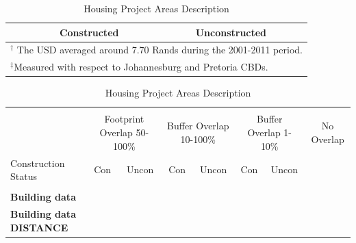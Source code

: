 \documentclass[12pt]{article}
\begin{document}
\vspace{0mm}
\begin{table}[h!]
\centering
\caption{Housing Project Areas Description}\label{table:projectdescriptives}
\vspace{0mm}
\begin{tabular}{l*{1}{cc}}
\toprule
  &Constructed & Unconstructed \\
\midrule

\bottomrule
\multicolumn{3}{l}{\scriptsize $^\dagger$ The USD averaged around 7.70 Rands during the 2001-2011 period.}\\[-.5em]
\multicolumn{3}{l}{\scriptsize $^\ddagger$Measured with respect to Johannesburg and Pretoria CBDs. } \\[-.5em]
\end{tabular}
\end{table} 



\vspace{0mm}
\begin{table}[h!]
\centering
\caption{Housing Project Areas Description}\label{table:projectdescriptives}
\vspace{0mm}
\begin{tabular}{l*{1}{ccccccc}}
\toprule
\\[-.5em]
&\multicolumn{2}{C}{Footprint Overlap 50-100\%} &\multicolumn{2}{G}{Buffer Overlap 10-100\%}  &\multicolumn{2}{C}{Buffer Overlap 1-10\%} & \multicolumn{1}{G}{No Overlap} \\[3em]
Construction Status  &Con & Uncon   &Con & Uncon  &Con & Uncon   & \\[.3em]
\midrule
\\[-.5em]
\textbf{Building data} \\[1em]

\textbf{Building data DISTANCE} \\[1em]

% 
% 
\bottomrule
\end{tabular}
\end{table} 
\end{document}
